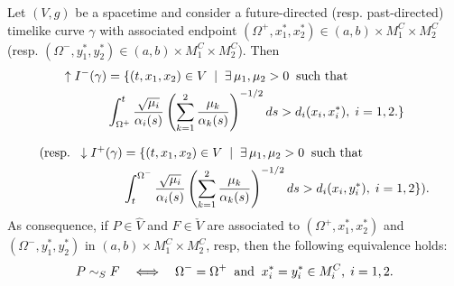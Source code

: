 \begin{prop}
\label{tip}
Let $(V,g)$ be a \multiwarped spacetime and consider a future-directed (resp. past-directed) timelike curve $\gamma$ with associated endpoint $(\Omega^+,x_1^*,x_2^*) \in (a,b) \times M_{1}^{C} \times M_{2}^{C}$  (resp. $(\Omega^-,y_1^*,y_2^*) \in (a,b) \times M_{1}^{C} \times M_{2}^{C}$). Then
\begin{equation}
\begin{aligned}
        \uparrow I^{-}(\gamma) &=\{(t,x_1,x_2) \in V\; \mid\; \exists \,  \mu_{1},\mu_{2} > 0\;\; \hbox{{\rm such that}} \\
        & \Integral{\Omega^+}{t}{\mu_{i}}{i}{\mu_{k}}> d_{i}(x_{i},x_{i}^*),\; i=1,2.\}%
\end{aligned}
\end{equation}

\begin{equation*}
\begin{aligned}
(\hbox{resp.}\;\;\downarrow I^{+}(\gamma) &=\{(t,x_1,x_2) \in V\; \mid\; \exists \,  \mu_{1},\mu_{2} > 0\;\; \hbox{{\rm such that}} \\
                & \Integral{t}{\Omega^-}{\mu_{i}}{i}{\mu_{k}}> d_{i}(x_{i},y^{*}_{i}),\; i=1,2\}).%
\end{aligned}
\end{equation*}
As consequence, if $P\in\hat{V}$ and $F\in\check{V}$ are associated to $(\Omega^+,x^*_1,x^*_2)$ and $(\Omega^-,y^*_1,y^*_2)$ in $(a,b) \times M_{1}^{C} \times M_{2}^{C}$, resp, then the following equivalence holds:
\[
P \sim_{S} F\quad \Longleftrightarrow\quad
\Omega^{-}=\Omega^{+}\;\;\hbox{and}\;\; x^*_{i}=y^*_{i} \in M_{i}^{C},\; i=1,2.
\]
\end{prop}
